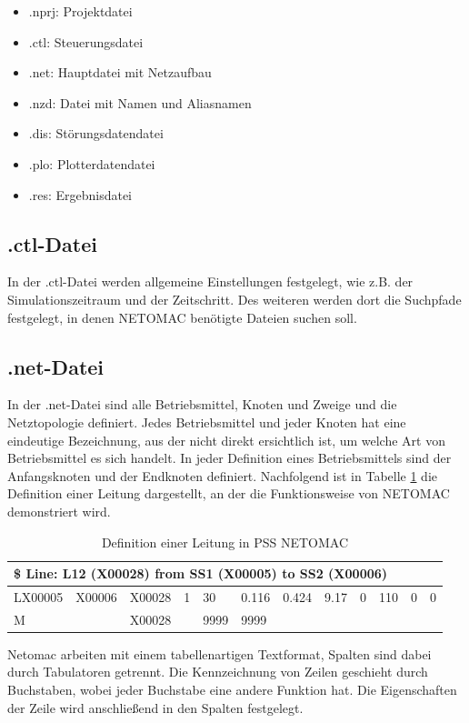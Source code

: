 \documentclass{scrartcl}
\begin{document}
\begin{onehalfspace}
\begin{itemize}
\item .nprj: Projektdatei
\item .ctl: Steuerungsdatei
\item .net: Hauptdatei mit Netzaufbau
\item .nzd: Datei mit Namen und Aliasnamen
\item .dis: Störungsdatendatei
\item .plo: Plotterdatendatei
\item .res: Ergebnisdatei
\end{itemize}


\subsection{.ctl-Datei}
In der .ctl-Datei werden allgemeine Einstellungen festgelegt, wie z.B. der Simulationszeitraum und der Zeitschritt. Des weiteren werden dort die Suchpfade festgelegt, in denen NETOMAC benötigte Dateien suchen soll.

\subsection{.net-Datei}
In der .net-Datei sind alle Betriebsmittel, Knoten und Zweige und die Netztopologie definiert. Jedes Betriebsmittel und jeder Knoten hat eine eindeutige Bezeichnung, aus der nicht direkt ersichtlich ist, um welche Art von Betriebsmittel es sich handelt. In jeder Definition eines Betriebsmittels sind der Anfangsknoten und der Endknoten definiert. Nachfolgend ist in Tabelle \ref{leitung-netomac-tb} die Definition einer Leitung dargestellt, an der die Funktionsweise von NETOMAC demonstriert wird.

\begin{table}[H]
\begin{tabular}{|l|l|l|l|l|l|l|l|l|l|l|l|}
\hline 
\multicolumn{12}{|l|}{\$ Line: L12 (X00028) from SS1 (X00005) to SS2 (X00006)} \\ 
\hline 
LX00005 & X00006  & X00028 & 1 & 30 & 0.116 & 0.424 & 9.17 & 0 & 110 & 0 &0 \\ 
\hline 
M & & X00028 & & 9999 & 9999 & & & & & & \\ 
\hline 
\end{tabular} 
\caption{Definition einer Leitung in PSS NETOMAC}
\label{leitung-netomac-tb}
\end{table}

Netomac arbeiten mit einem tabellenartigen Textformat, Spalten sind dabei durch Tabulatoren getrennt. Die Kennzeichnung von Zeilen geschieht durch Buchstaben, wobei jeder Buchstabe eine andere Funktion hat. Die Eigenschaften der Zeile wird anschließend in den Spalten festgelegt.


\end{onehalfspace}
\end{document}
